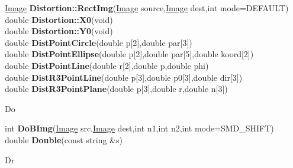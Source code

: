 \documentclass[10pt,titlepage]{article}
\def\functionlistentry#1#2#3#4#5#6{\noindent #1 {\bf #2}(#3) \dotfill #6\\}
\def\letterref#1{}
\def\letterlabel#1{\vspace{0.5cm}\centerline{\Large #1}}
\def\letterlabelend#1{}
\begin{document}
{{\functionlistentry{\hyperlink{Image}{Image}}{Distortion::RectImg}{\hyperlink{Image}{Image} source,\hyperlink{Image}{Image} dest,int mode=DEFAULT}{768}{geoTrafo}{}
\functionlistentry{double}{Distortion::X0}{void}{748}{geoTrafo}{}
\functionlistentry{double}{Distortion::Y0}{void}{749}{geoTrafo}{}
\functionlistentry{double}{DistPointCircle}{double p[2],double par[3]}{1375}{numeric}{}
\functionlistentry{double}{DistPointEllipse}{double p[2],double par[5],double koord[2]}{1376}{numeric}{}
\functionlistentry{double}{DistPointLine}{double r[2],double p,double phi}{1373}{numeric}{}
\functionlistentry{double}{DistR3PointLine}{double p[3],double p0[3],double dir[3]}{1394}{numeric}{}
\functionlistentry{double}{DistR3PointPlane}{double p[3],double r,double n[3]}{1395}{numeric}{}

\letterlabel{Do}
\letterref{A}
\letterref{B}
\letterref{C}
\letterref{D}
\letterref{E}
\letterref{F}
\letterref{G}
\letterref{H}
\letterref{I}
\letterref{K}
\letterref{L}
\letterref{M}
\letterref{N}
\letterref{O}
\letterref{P}
\letterref{Q}
\letterref{R}
\letterref{S}
\letterref{T}
\letterref{U}
\letterref{V}
\letterref{W}
\letterref{X}
\letterref{Y}
\letterref{Z}

\letterref{De}
\letterref{Di}
\letterref{Do}
\letterref{Dr}
\letterref{Du}
\letterlabelend{Do}
\functionlistentry{int}{DoBImg}{\hyperlink{Image}{Image} src,\hyperlink{Image}{Image} dest,int n1,int n2,int mode=SMD\_SHIFT}{345}{filter}{}
\functionlistentry{double}{Double}{const string \&s}{1410}{genericTools}{}

\letterlabel{Dr}
\letterref{A}
\letterref{B}
\letterref{C}
\letterref{D}
\letterref{E}
\letterref{F}
\letterref{G}
\letterref{H}
\letterref{I}
\letterref{K}
\letterref{L}
\letterref{M}
\letterref{N}
\letterref{O}
\letterref{P}
\letterref{Q}
\letterref{R}
\letterref{S}
\letterref{T}
\letterref{U}
\letterref{V}
\letterref{W}
\letterref{X}
\letterref{Y}
\letterref{Z}

}}
\end{document}
